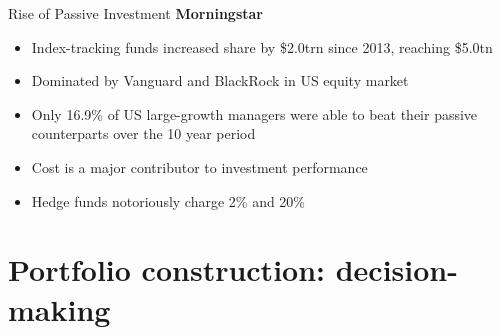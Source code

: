 \documentclass[14pt,xcolor=pdftex,dvipsnames,table]{beamer}\usepackage[]{graphicx}\usepackage[]{color}
\begin{document}
\begin{frame}{Rise of Passive Investment}
\textbf{Morningstar}
\begin{itemize}[<+-| alert@+>]
\pause
\item Index-tracking funds increased share by \$2.0trn since 2013, reaching \$5.0tn
\item Dominated by Vanguard and BlackRock in US equity market
\item Only 16.9\% of US large-growth managers were able to beat their passive counterparts over the 10 year period
\item Cost is a major contributor to investment performance
\item Hedge funds notoriously charge 2\% and 20\%
\end{itemize}
\end{frame}

\section{Portfolio construction: decision-making}
\end{document}
